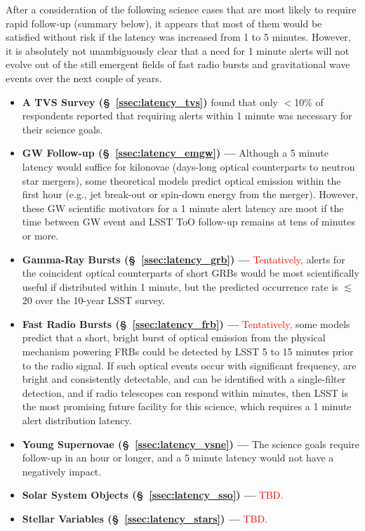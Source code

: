 \documentclass[DM,lsstdraft,authoryear,toc]{lsstdoc}
\begin{document}
After a consideration of the following science cases that are most likely to require rapid follow-up (summary below), it appears that most of them would be satisfied without risk if the latency was increased from 1 to 5 minutes. 
However, it is absolutely not unambiguously clear that a need for 1 minute alerts will not evolve out of the still emergent fields of fast radio bursts and gravitational wave events over the next couple of years.
\begin{itemize}
\item {\bf A TVS Survey (\S~\ref{ssec:latency_tvs})} found that only $<$10\% of respondents reported that requiring alerts within 1 minute was necessary for their science goals.
\item {\bf GW Follow-up (\S~\ref{ssec:latency_emgw}) ---} Although a 5 minute latency would suffice for kilonovae (days-long optical counterparts to neutron star mergers), some theoretical models predict optical emission within the first hour (e.g., jet break-out or spin-down energy from the merger). However, these GW scientific motivators for a 1 minute alert latency are moot if the time between GW event and LSST ToO follow-up remains at tens of minutes or more.
\item {\bf Gamma-Ray Bursts (\S~\ref{ssec:latency_grb}) ---} \textcolor{red}{Tentatively,} alerts for the coincident optical counterparts of short GRBs would be most scientifically useful if distributed within 1 minute, but the predicted occurrence rate is $\lesssim$20 over the 10-year LSST survey.
\item {\bf Fast Radio Bursts (\S~\ref{ssec:latency_frb}) ---} \textcolor{red}{Tentatively,} some models predict that a short, bright burst of optical emission from the physical mechanism powering FRBs could be detected by LSST 5 to 15 minutes prior to the radio signal.
If such optical events occur with significant frequency, are bright and consistently detectable, and can be identified with a single-filter detection, and if radio telescopes can respond within minutes, then LSST is the most promising future facility for this science, which requires a 1 minute alert distribution latency.
\item {\bf Young Supernovae (\S~\ref{ssec:latency_ysne}) ---} The science goals require follow-up in an hour or longer, and a 5 minute latency would not have a negatively impact.
\item {\bf Solar System Objects (\S~\ref{ssec:latency_sso}) ---} \textcolor{red}{TBD.}
\item {\bf Stellar Variables (\S~\ref{ssec:latency_stars}) ---} \textcolor{red}{TBD.}
\end{itemize}
\end{document}

